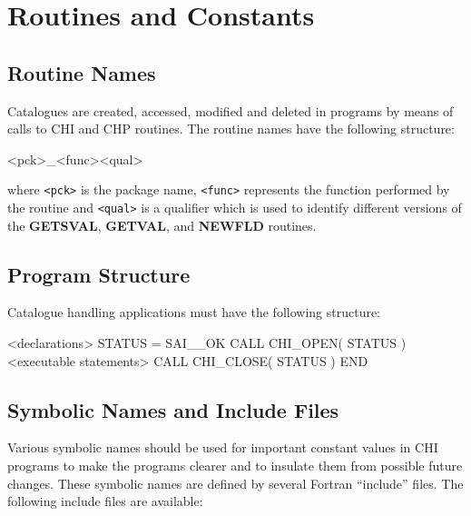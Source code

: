 \documentclass[11pt,nolof]{starlink}
\begin{document}
\section{Routines and Constants}

\subsection{Routine Names}

Catalogues are created, accessed, modified and deleted in programs by means of
calls to CHI and CHP routines. The routine names have the following structure:

\begin{terminalv}
<pck>_<func><qual>
\end{terminalv}

where \verb+<pck>+ is the package name, \verb+<func>+ represents the
function performed by the routine and \verb+<qual>+ is a qualifier which is
used to identify different versions of the \textbf{GETSVAL}, \textbf{GETVAL},
and \textbf{NEWFLD} routines.

\subsection{Program Structure}

Catalogue handling applications must have the following structure:

\begin{terminalv}
      <declarations>
      STATUS = SAI__OK
      CALL CHI_OPEN( STATUS )
      <executable statements>
      CALL CHI_CLOSE( STATUS )
      END
\end{terminalv}

\subsection{Symbolic Names and Include Files}

Various symbolic names should be used for important constant values in CHI
programs to make the programs clearer and to insulate them from possible future
changes. These symbolic names are defined by several Fortran ``include'' files.
The following include files are available:
\end{document}
